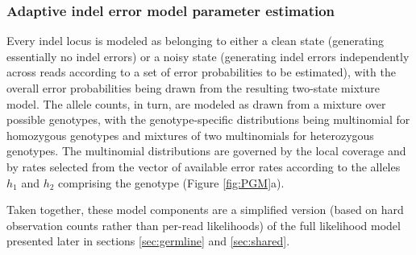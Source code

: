 \documentclass{article}
\begin{document}
\subsubsection{Adaptive indel error model parameter estimation}
Every indel locus is modeled as belonging to either a clean state (generating essentially no indel errors) or a noisy state (generating indel errors independently across reads according to a set of error probabilities to be estimated), with the overall error probabilities being drawn from the resulting two-state mixture model. The allele counts, in turn, are modeled as drawn from a mixture over possible genotypes, with the genotype-specific distributions being multinomial for homozygous genotypes and mixtures of two multinomials for heterozygous genotypes. The multinomial distributions are governed by the local coverage  and by rates selected from the vector of available error rates according to the alleles $h_1$ and $h_2$ comprising the genotype (Figure \ref{fig:PGM}a).

Taken together, these model components are a simplified version (based on hard observation counts rather than per-read likelihoods) of the full likelihood model presented later in sections \ref{sec:germline} and \ref{sec:shared}.
\end{document}
